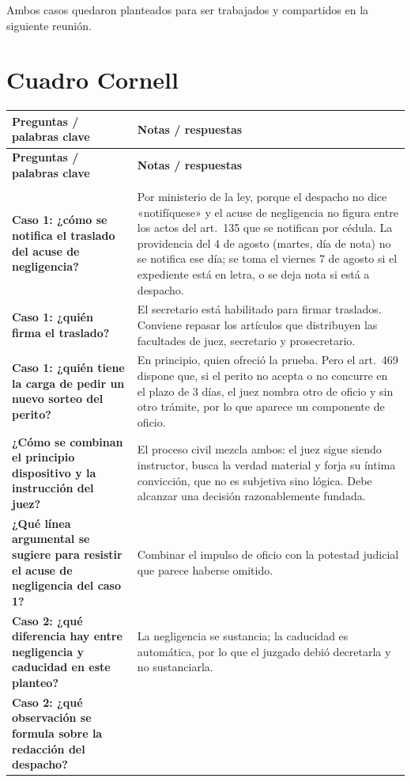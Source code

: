 \documentclass[12pt,oneside]{book}
\newlength{\cornellizq}
\newlength{\cornellder}
\newenvironment{cornell}
{\begin{longtable}{>{\columncolor{gray!10}\raggedright\arraybackslash}p{\cornellizq}>{\raggedright\arraybackslash}p{\cornellder}}
\toprule
\textbf{Preguntas / palabras clave} & \textbf{Notas / respuestas} \\
\midrule
\endfirsthead
\toprule
\textbf{Preguntas / palabras clave} & \textbf{Notas / respuestas} \\
\midrule
\endhead
\midrule
\multicolumn{2}{r}{\footnotesize\itshape Continúa en la página siguiente} \\
\endfoot
\endlastfoot}
{\end{longtable}}
\begin{document}
\begin{note}
Ambos casos quedaron planteados para ser trabajados y compartidos en la siguiente reunión.
\end{note}

\section{Cuadro Cornell}

\begin{cornell}
\textbf{Caso 1: ¿cómo se notifica el traslado del acuse de negligencia?} &
Por ministerio de la ley, porque el despacho no dice «notifíquese» y el acuse de negligencia no figura entre los actos del art.~135 que se notifican por cédula. La providencia del 4 de agosto (martes, día de nota) no se notifica ese día; se toma el viernes 7 de agosto si el expediente está en letra, o se deja nota si está a despacho. \\
\addlinespace
\midrule[0.3pt]
\textbf{Caso 1: ¿quién firma el traslado?} &
El secretario está habilitado para firmar traslados. Conviene repasar los artículos que distribuyen las facultades de juez, secretario y prosecretario. \\
\addlinespace
\midrule[0.3pt]
\textbf{Caso 1: ¿quién tiene la carga de pedir un nuevo sorteo del perito?} &
En principio, quien ofreció la prueba. Pero el art.~469 dispone que, si el perito no acepta o no concurre en el plazo de 3 días, el juez nombra otro de oficio y sin otro trámite, por lo que aparece un componente de oficio. \\
\addlinespace
\midrule[0.3pt]
\textbf{¿Cómo se combinan el principio dispositivo y la instrucción del juez?} &
El proceso civil mezcla ambos: el juez sigue siendo instructor, busca la verdad material y forja su íntima convicción, que no es subjetiva sino lógica. Debe alcanzar una decisión razonablemente fundada. \\
\addlinespace
\midrule[0.3pt]
\textbf{¿Qué línea argumental se sugiere para resistir el acuse de negligencia del caso 1?} &
Combinar el impulso de oficio con la potestad judicial que parece haberse omitido. \\
\addlinespace
\midrule[0.3pt]
\textbf{Caso 2: ¿qué diferencia hay entre negligencia y caducidad en este planteo?} &
La negligencia se sustancia; la caducidad es automática, por lo que el juzgado debió decretarla y no sustanciarla. \\
\addlinespace
\midrule[0.3pt]
\textbf{Caso 2: ¿qué observación se formula sobre la redacción del despacho?} &

\end{cornell}
\end{document}
